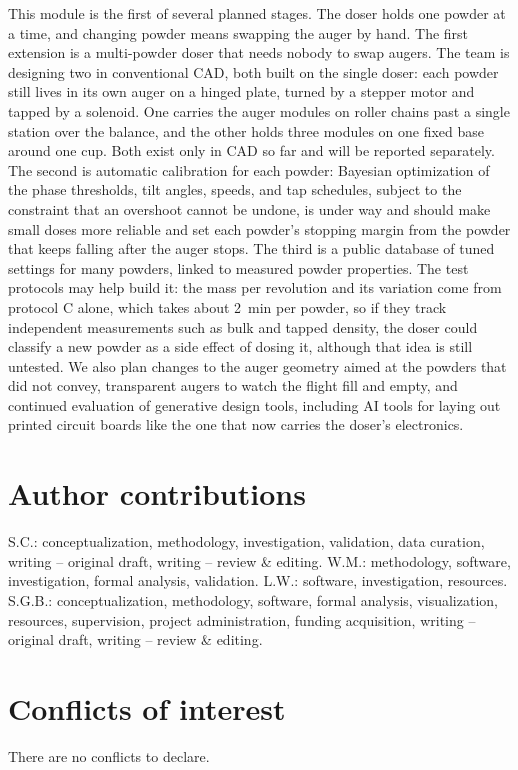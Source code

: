 \documentclass[twoside,twocolumn,9pt]{article}
\begin{document}
\label{sec:future}
This module is the first of several planned stages. The doser holds one powder at a time, and changing powder means swapping the auger by hand. The first extension is a multi-powder doser that needs nobody to swap augers. The team is designing two in conventional CAD, both built on the single doser: each powder still lives in its own auger on a hinged plate, turned by a stepper motor and tapped by a solenoid. One carries the auger modules on roller chains past a single station over the balance, and the other holds three modules on one fixed base around one cup. Both exist only in CAD so far and will be reported separately. The second is automatic calibration for each powder: Bayesian optimization of the phase thresholds, tilt angles, speeds, and tap schedules, subject to the constraint that an overshoot cannot be undone, is under way and should make small doses more reliable and set each powder's stopping margin from the powder that keeps falling after the auger stops. The third is a public database of tuned settings for many powders, linked to measured powder properties. The test protocols may help build it: the mass per revolution and its variation come from protocol C alone, which takes about 2~min per powder, so if they track independent measurements such as bulk and tapped density, the doser could classify a new powder as a side effect of dosing it, although that idea is still untested. We also plan changes to the auger geometry aimed at the powders that did not convey, transparent augers to watch the flight fill and empty, and continued evaluation of generative design tools, including AI tools for laying out printed circuit boards like the one that now carries the doser's electronics.

\section*{Author contributions}
S.C.: conceptualization, methodology, investigation, validation, data curation, writing -- original draft, writing -- review \& editing. W.M.: methodology, software, investigation, formal analysis, validation. L.W.: software, investigation, resources. S.G.B.: conceptualization, methodology, software, formal analysis, visualization, resources, supervision, project administration, funding acquisition, writing -- original draft, writing -- review \& editing.

\section*{Conflicts of interest}
There are no conflicts to declare.
\end{document}
